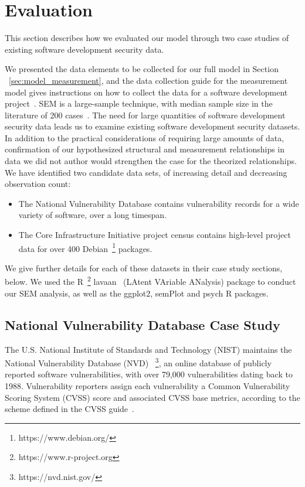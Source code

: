 \section{Evaluation}
\label{sec:evaluation}

This section describes how we evaluated our model through two case studies of existing software development security data.

We presented the data elements to be collected for our full model in Section ~\ref{sec:model_measurement}, and the data collection guide for the measurement model gives instructions on how to collect the data for a software development project~\cite{morrison2016spefsite}.  SEM is a large-sample technique, with median sample size in the literature of 200 cases~\cite{kline2015principles}. The need for large quantities of software development security data leads us to examine existing software development security datasets. In addition to the practical considerations of requiring large amounts of data, confirmation of our hypothesized structural and measurement relationships in data we did not author would strengthen the case for the theorized relationships.
We have identified two candidate data sets, of increasing detail and decreasing observation count: 
\begin{itemize}
\item The National Vulnerability Database contains vulnerability records for a wide variety of software, over a long timespan.
\item The Core Infrastructure Initiative project census contains high-level project data for over 400 Debian~\footnote{https://www.debian.org/} packages.
\end{itemize}

We give further details for each of these datasets in their case study sections, below. We used the R~\footnote{https://www.r-project.org}  lavaan~\cite{roseel2012lavaan} (LAtent VAriable ANalysis) package to conduct our SEM analysis, as well as the ggplot2, semPlot and psych R packages.

\subsection{National Vulnerability Database Case Study}

The U.S. National Institute of Standards and Technology (NIST) maintains the National Vulnerability Database (NVD) ~\footnote{https://nvd.nist.gov/}, an online database of publicly reported software vulnerabilities, with over 79,000 vulnerabilities dating back to 1988. Vulnerability reporters assign each vulnerability a Common Vulnerability Scoring System (CVSS) score and associated CVSS base metrics, according to the scheme defined in the CVSS guide~\cite{mell2007complete}.  

